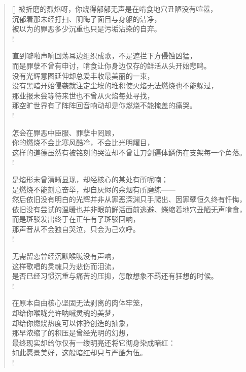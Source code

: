 \documentclass[UTF8, 12pt, a4paper]{ctexrep} %
\begin{document}
\begin{verse}[\versewidth]
被折磨的烈焰呀，你烧得郁郁无声是在啃食地穴丑陋没有喧嚣，\\
沉郁着那未经打扫、阴晦了面目与身躯的洁净，\\
被以为的罪恶多少沉重也只是污垢沾染的自弃。\\!

直到噼啪声响回荡耳边组织成歌，不是遮拦下方侵蚀凶猛，\\
而是罪孽不曾有申讨，啃食让你身边仅存的鲜活从头开始悲鸣。\\
没有光辉意图延伸却总爱丰收最美丽的一束，\\
没有黑暗开始侵袭就注定尘埃的堆积使火焰无法燃烧也不能躲过，\\
那业报未尝等待来世也不曾从火焰每处寻找，\\
那空旷世界有了阵阵回音响动却是你燃烧不能掩盖的痛哭。\\!

怎会在罪恶中臣服、罪孽中罔顾，\\
你的燃烧不会比寒风酷冷，不会比光明耀目，\\
这样的道德虽然有被铭刻的哭泣却不曾让刀剑遍体鳞伤在支架每一个角落。\\!

是焰形未曾清晰显现，却经核心的某处有所呢喃；\\
是燃烧不能刻意奋举，却自灰烬的余烟有所磨练——\\
然后依旧没有明白的光辉并非从罪恶深渊只手爬出、因罪孽恒久终有忏悔，\\
依旧没有尝试的温暖也并非眼前鲜活面前逃避、蜷缩着地穴丑陋无声啃食，\\
而是斑驳发出终于在正午有了斑驳回响，\\
那声音从不会独自哭泣，只会为己欢呼。\\!

无需留恋曾经沉默喉咙没有声响，\\
这样歌唱的灵魂只为悲伤而泪流，\\
是否已经习惯沉重与痛苦的压抑，怎敢想象不羁还有狂想的时候。\\!

在原本自由核心坚固无法剥离的肉体牢笼，\\
却给你喉咙允许呐喊灵魂的美梦，\\
却给你燃烧热度可以体验创造的抽象，\\
那早浓缩了的积压是曾经光明的幻想，\\
最终现实却给你仅有一缕明亮还将它彻身染成暗红：\\
如此愿景美好，这般暗红却只与严酷为伍。\\!


\end{verse}
\end{document}
